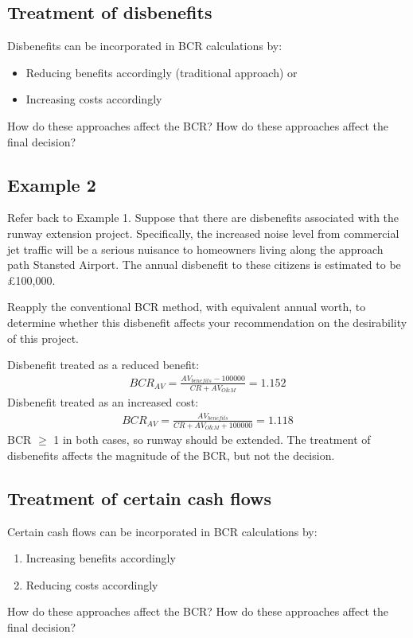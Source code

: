 \subsection{Treatment of disbenefits}
Disbenefits can be incorporated in BCR calculations by:
\begin{itemize}
  \item Reducing benefits accordingly (traditional approach) or
  \item Increasing costs accordingly
\end{itemize}
How do these approaches affect the BCR? How do these approaches affect the final decision?
\subsection{Example 2}
Refer back to Example 1. Suppose that there are disbenefits associated with the runway extension project. Specifically, the increased noise level from commercial jet traffic will be a serious nuisance to homeowners living along the approach path Stansted Airport. The annual disbenefit to these citizens is estimated to be \pounds 100,000.

Reapply the conventional BCR method, with equivalent annual worth, to determine whether this disbenefit affects your recommendation on the desirability of this project.

Disbenefit treated as a reduced benefit:
\begin{gather}
  BCR_{AV} = \frac{AV_{benefits}-100000}{CR + AV_{O\&M}} = 1.152
\end{gather}
Disbenefit treated as an increased cost:
\begin{gather}
  BCR_{AV} = \frac{AV_{benefits}}{CR + AV_{O\&M}+100000} = 1.118
\end{gather}
BCR $\geq$ 1 in both cases, so runway should be extended. The treatment of disbenefits affects the magnitude of the BCR, but not the decision.
\subsection{Treatment of certain cash flows}
Certain cash flows can be incorporated in BCR calculations by:
\begin{enumerate}
  \item Increasing benefits accordingly
  \item Reducing costs accordingly
\end{enumerate}
How do these approaches affect the BCR? How do these approaches affect the final decision?
